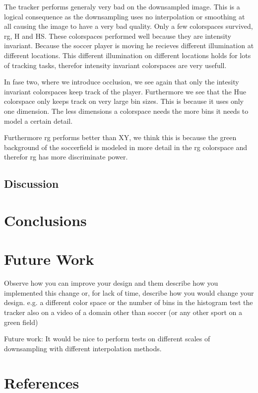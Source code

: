 \documentclass[a4paper,11pt]{article}
\begin{document}
The tracker performs generaly very bad on the downsampled image. This is a
logical consequence as the downsampling uses no interpolation or smoothing at
all causing the image to have a very bad quality. Only a few colorspaces
survived, rg, H and HS. These colorspaces performed well because they are
intensity invariant. Because the soccer player is moving he recieves different
illumination at different locations. This different illumination on different
locations holds for lots of tracking tasks, therefor intensity
invariant colorspaces are very usefull.

In fase two, where we introduce occlusion, we see again that only the intesity
invariant colorspaces keep track of the player. Furthermore we see that the Hue
colorspace only keeps track on very large bin sizes. This is because it uses
only one dimension. The less dimensions a colorspace needs the more bins it
needs to model a certain detail.

Furthermore rg performs better than XY, we think this is because the green
background of the soccerfield is modeled in more detail in the rg colorspace and
therefor rg has more discriminate power.


\subsection{Discussion} %
\section{Conclusions} \label{sec:conc}
\section{Future Work} \label{sec:fut}
Observe how you can improve your design and them describe how you implemented this change or, for lack of time, describe how you would change your design. 
e.g. a different color space or the number of bins in the histogram
test the tracker also on a video of a domain other than soccer (or any other sport on a green field)

Future work:
It would be nice to perform tests on different scales of downsampling with
different interpolation methods.



\section{References} 


\renewcommand\bibname{References}


\end{document}
